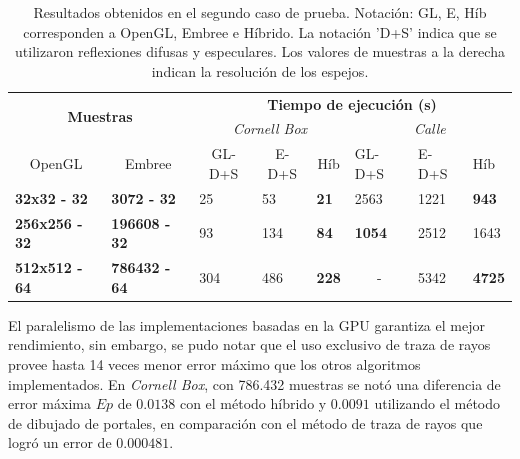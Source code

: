 \begin{table}[htbp!]
	\centering
	\begin{tabular}{|l|l|l|l|l||l|l|l|}
		\hline
		\multicolumn{2}{|c|}{\multirow{2}{*}{\textbf{Muestras}}} & \multicolumn{6}{c|}{\textbf{Tiempo de ejecución (s)}}                                                                                  \\ \cline{3-8} 
		\multicolumn{2}{|c|}{}                   & \multicolumn{3}{c||}{\textit{Cornell Box}}                 & \multicolumn{3}{c|}{\textit{Calle}}                      \\ \cline{1-8}
		\multicolumn{1}{|c|}{OpenGL} &\multicolumn{1}{c|}{Embree} & \multicolumn{1}{c|}{GL-D+S} & \multicolumn{1}{c|}{E-D+S} & \multicolumn{1}{c||}{Híb} & GL-D+S                 & E-D+S & Híb \\ \hline
		\textbf{32x32 - 32}                                &
		\textbf{3072 - 32}                                & 25                         & 53                          & \textbf{21}                           & 2563                   & 1221   & \textbf{943}     \\ \hline
		\textbf{256x256 - 32}                                &
		\textbf{196608 - 32}                               & 93                         & 134                         & \textbf{84}                          & \textbf{1054}                   & 2512   & 1643    \\ \hline
		\textbf{512x512 - 64} &\textbf{786432 - 64}                              & 304                        & 486                         & \textbf{228}                          & \multicolumn{1}{c|}{-} & 5342   & \textbf{4725}    \\ \hline
	\end{tabular}
	\caption{Resultados obtenidos en el segundo caso de prueba. Notación: GL, E, Híb corresponden a OpenGL, Embree e Híbrido. La notación 'D+S' indica que se utilizaron reflexiones difusas y especulares. Los valores de muestras a la derecha indican la resolución de los espejos. \protect\footnotemark}
	\label{tab:caso2}
\end{table}

El paralelismo de las implementaciones basadas en la GPU garantiza el mejor rendimiento, sin embargo, se pudo notar que el uso exclusivo de traza de rayos provee hasta 14 veces menor error máximo que los otros algoritmos implementados. En \textit{Cornell Box}, con 786.432 muestras se notó una diferencia de error máxima $Ep$ de $0.0138$ con el método híbrido y $0.0091$ utilizando el método de dibujado de portales, en comparación con el método de traza de rayos que logró un error de $0.000481$.

